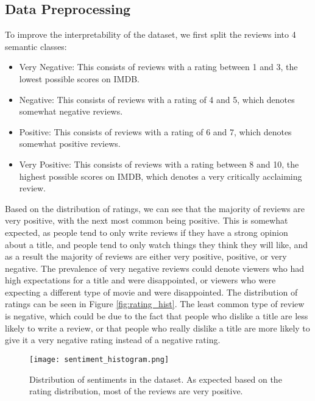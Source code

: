 \documentclass[12pt]{article}    %
\begin{document}
\subsection{Data Preprocessing}

To improve the interpretability of the dataset, we first split the reviews into 4 semantic classes: 

\begin{itemize}
    \item Very Negative: This consists of reviews with a rating between 1 and 3, the lowest possible scores on IMDB.
    \item Negative: This consists of reviews with a rating of 4 and 5, which denotes somewhat negative reviews.
    \item Positive: This consists of reviews with a rating of 6 and 7, which denotes somewhat positive reviews.
    \item Very Positive: This consists of reviews with a rating between 8 and 10, the highest possible scores on IMDB, which denotes a very critically acclaiming review.
\end{itemize}

Based on the distribution of ratings, we can see that the majority of reviews are very positive, with the next most common being positive. This is somewhat expected, as people tend to only write reviews if they have a strong opinion about a title, and people tend to only watch things they think they will like, and as a result the majority of reviews are either very positive, positive, or very negative. The prevalence of very negative reviews could denote viewers who had high expectations for a title and were disappointed, or viewers who were expecting a different type of movie and were disappointed. The distribution of ratings can be seen in Figure \ref{fig:rating_hist}. The least common type of review is negative, which could be due to the fact that people who dislike a title are less likely to write a review, or that people who really dislike a title are more likely to give it a very negative rating instead of a negative rating.

\begin{figure}
    \centering
    \texttt{[image: sentiment\_histogram.png]}
    \caption{Distribution of sentiments in the dataset. As expected based on the rating distribution, most of the reviews are very positive.}
    \label{fig:sentiment_hist}
\end{figure}

\end{document}
